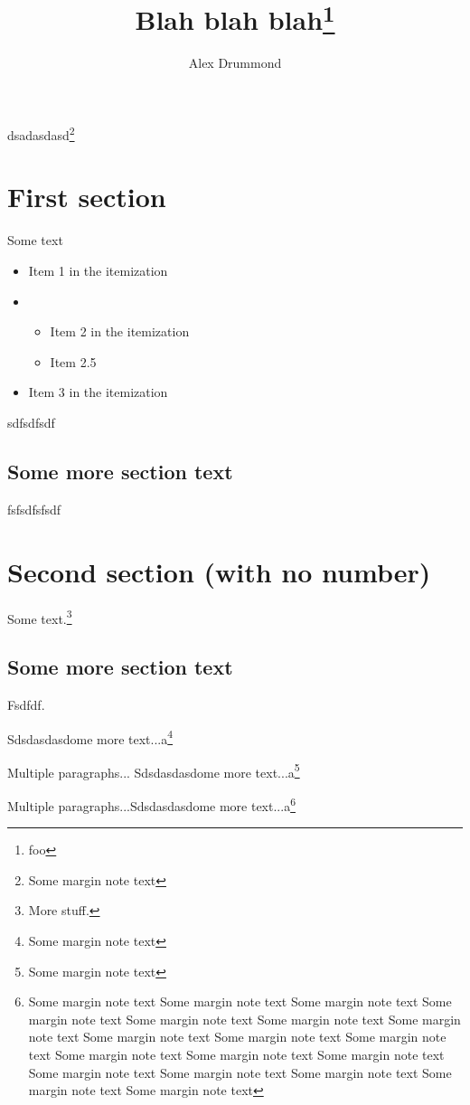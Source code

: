 \documentclass[doublespace,handout,marginnotes]{lingpaper}
\author{Alex Drummond}
\title{Blah blah blah\thanks{foo}}
\begin{document}
\maketitle

\noindent
dsadasdasd\footnote{Some margin note text}


\section{First section}
Some text

\begin{itemize}
\setlength\topsep{50pt}%
\setlength\partopsep{50pt}%
\setlength\itemsep{0pt}
\item
Item 1 in the itemization
\item
\begin{itemize}
\item
Item 2 in the itemization
\item
Item 2.5
\end{itemize}
\item
Item 3 in the itemization
\end{itemize}

sdfsdfsdf

\subsection{Some more section text}
fsfsdfsfsdf

\section*{Second section (with no number)}
Some text.\footnote{More stuff.}

\subsection{Some more section text}
Fsdfdf.

Sdsdasdasdome more text...a\footnote{Some margin note text}

Multiple paragraphs...
Sdsdasdasdome more text...a\footnote{Some margin note text}

Multiple paragraphs...Sdsdasdasdome more text...a\footnote{Some margin note text  Some margin note text  Some margin note text  Some margin note text Some margin note text Some margin note text Some margin note text Some margin note text Some margin note text Some margin note text Some margin note text Some margin note text Some margin note text Some margin note text Some margin note text Some margin note text Some margin note text Some margin note text }
\end{document}
